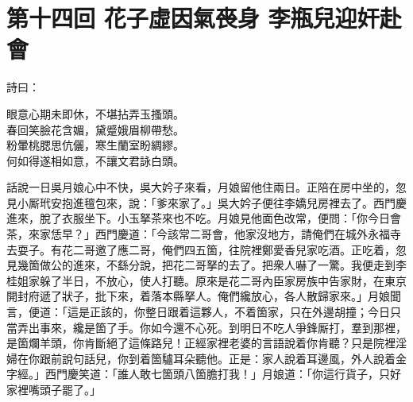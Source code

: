 
\chapter*{第十四回 花子虛因氣䘮身 李瓶兒迎奸赴會}


詩曰：

\begin{myquote}
眼意心期未即休，不堪拈弄玉搔頭。\\春回笑臉花含媚，黛蹙娥眉柳帶愁。\\粉暈桃腮思伉儷，寒生蘭室盼綢繆。\\何如得遂相如意，不讓文君詠白頭。
\end{myquote}

話說一日吳月娘心中不快，吳大妗子來看，月娘留他住兩日。正陪在房中坐的，忽見小厮玳安抱進氊包來，說：「爹來家了。」吳大妗子便往李嬌兒房裡去了。西門慶進來，脫了衣服坐下。小玉拏茶來也不吃。月娘見他面色改常，便問：「你今日會茶，來家恁早？」西門慶道：「今該常二哥會，他家沒地方，請俺們在城外永福寺去耍子。有花二哥邀了應二哥，俺們四五箇，往院裡鄭愛香兒家吃酒。正吃着，忽見幾箇做公的進來，不繇分說，把花二哥拏的去了。把衆人嚇了一驚。我便走到李桂姐家躲了半日，不放心，使人打聽。原來是花二哥內臣家房族中告家財，在東京開封府遞了狀子，批下來，着落本縣拏人。俺們纔放心，各人散歸家來。」月娘聞言，便道：「這是正該的，你整日跟着這夥人，不着箇家，只在外邊胡撞；今日只當弄出事來，纔是箇了手。你如今還不心死。到明日不吃人爭鋒厮打，羣到那裡，是箇爛羊頭，你肯斷絕了這條路兒！正經家裡老婆的言語說着你肯聽？只是院裡淫婦在你跟前說句話兒，你到着箇驢耳朵聽他。正是：家人說着耳邊風，外人說着金字經。」西門慶笑道：「誰人敢七箇頭八箇膽打我！」{}月娘道：「你這行貨子，只好家裡嘴頭子罷了。」

